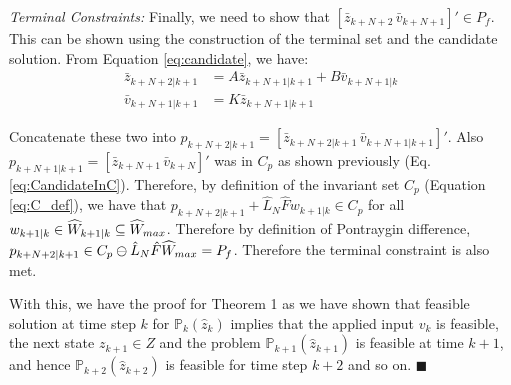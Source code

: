 \textit{Terminal Constraints:} Finally, we need to show that $[\bar{z}_{k+N+2} \, \bar{v}_{k+N+1}]' \in P_f$. This can be shown using the construction of the terminal set and the candidate solution. From Equation \ref{eq:candidate}, we have:
\begin{subequations}
\begin{align}
\bar{z}_{k+N+2|k+1}&=A\bar{z}_{k+N+1|k+1} + B\bar{v}_{k+N+1|k} \\
\bar{v}_{k+N+1|k+1}&=K\bar{z}_{k+N+1|k+1}
\end{align}
\end{subequations}

Concatenate these two into $p_{k+N+2|k+1} = [\bar{z}_{k+N+2|k+1}\, \bar{v}_{k+N+1|k+1}]'$. Also $p_{k+N+1|k+1} = [\bar{z}_{k+N+1} \,\bar{v}_{k+N}]'$ was in $C_p$ as shown previously (Eq. \ref{eq:CandidateInC}). Therefore, by definition of the invariant set $C_p$ (Equation \ref{eq:C_def}), we have that $p_{k+N+2|k+1} + \hat{L}_N \hat{F} w_{k+1|k}\in C_p$ for all $w_{k+1|k}\in \widehat{W}_{k+1|k} \subseteq \widehat{W}_{max}$. Therefore by definition of Pontraygin difference, $p_{k+N+2|k+1} \in C_p \ominus \hat{L}_N\hat{F}\widehat{W}_{max} = P_f$. Therefore the terminal constraint is also met.

With this, we have the proof for Theorem 1 as we have shown that feasible solution at time step $k$ for $\mathbb{P}_{k}(\hat{z}_{k}) $ implies that the applied input $v_k$ is feasible, the next state $z_{k+1} \in Z$ and the problem $\mathbb{P}_{k+1}(\hat{z}_{k+1}) $ is feasible at time $k+1$, and hence  $\mathbb{P}_{k+2}(\hat{z}_{k+2}) $ is feasible for time step $k+2$ and so on. $\blacksquare$






